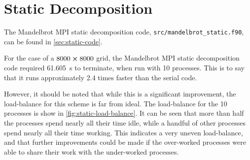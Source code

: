 \documentclass{article}
\begin{document}
\clearpage
\section{Static Decomposition}
\label{sec:static}

The Mandelbrot MPI static decomposition code,
\lstinline[style=ff]{src/mandelbrot_static.f90}, can be found in
\autoref{sec:static-code}.

For the case of a $8000 \cross 8000$ grid, the Mandelbrot MPI static
decomposition code required \SI{61.605}{\second} to terminate, when run with 10
processes.
This is to say that it runs approximately 2.4 times faster than the serial code.

However, it should be noted that while this is a significant improvement, the
load-balance for this scheme is far from ideal.
The load-balance for the 10 processes is show in
\autoref{fig:static-load-balance}.
It can be seen that more than half the processes spend nearly all their time
idle, while a handful of other processes spend nearly all their time working.
This indicates a very uneven load-balance, and that further improvements could
be made if the over-worked processes were able to share their work with the
under-worked processes.
\end{document}
